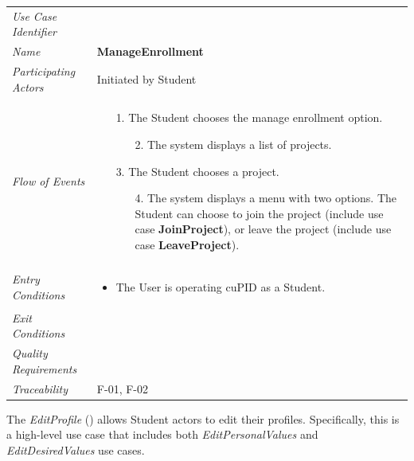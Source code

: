 \documentclass[12pt,letterpaper]{article}
\begin{document}
\begin{center}
	\begin{tabu} to 
		\toprule
		Use Case Identifier & \manageenrollment{} \\
		Name & {\bf ManageEnrollment} \\
		Participating Actors & Initiated by Student \\
		Flow of Events & 
		\begin{minipage}[t]{\linewidth}
		    \begin{enumerate}
			    \item[1.] The Student chooses the manage enrollment option.
			    \begin{enumerate}
			        \item[2.] The system displays a list of projects.
				\end{enumerate}
				\item[3.] The Student chooses a project.
				\begin{enumerate}
				    \item[4.] The system displays a menu with two options. The Student can choose to join the project (include use case \textbf{JoinProject}), or leave the project (include use case \textbf{LeaveProject}).
				\end{enumerate}
	        \end{enumerate}
		\end{minipage} \\

		Entry Conditions &
		\begin{minipage}[t]{\linewidth}
			\begin{itemize}
			    \item The User is operating cuPID as a Student.
	        \end{itemize}
		\end{minipage} \\

		Exit Conditions & \\


		Quality Requirements & \\

		Traceability & F-01, F-02\\
		\toprule
	\end{tabu}
\end{center}

\newpage{}

The {\it EditProfile} ({\bf \editprofile{}}) allows Student actors to edit their profiles. Specifically, this is a high-level use case that includes both {\it EditPersonalValues} and {\it EditDesiredValues} use cases.
\end{document}
